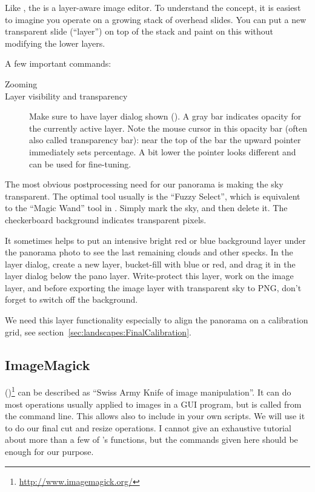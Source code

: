 Like , the  is a layer-aware image
editor. To understand the concept, it is easiest to imagine you
operate on a growing stack of overhead slides. You can put a new
transparent slide (``layer'') on top of the stack and paint on this
without modifying the lower layers.



A few important commands:

\begin{description}
\item[Zooming] 
\item[Layer visibility and transparency] Make sure to have layer
  dialog shown (). A gray bar indicates
  opacity for the currently active layer. Note the mouse cursor in
  this opacity bar (often also called transparency bar): near the top
  of the bar the upward pointer immediately sets percentage. A bit
  lower the pointer looks different and can be used for fine-tuning.
\end{description}


The most obvious postprocessing need for our panorama is making the sky
transparent. The optimal tool usually is the ``Fuzzy Select'', which
is equivalent to the ``Magic Wand'' tool in . Simply mark the
sky, and then delete it. The checkerboard background indicates
transparent pixels.


It sometimes helps to put an intensive bright red or blue background layer under the
panorama photo to see the last remaining clouds and other specks. In the layer dialog,
create a new layer, bucket-fill with blue or red, and drag it in the
layer dialog below the pano layer. Write-protect this layer, work on
the image layer, and before exporting the image layer with transparent
sky to PNG, don't forget to switch off the background.

We need this layer functionality especially to align the panorama on a
calibration grid, see section~\ref{sec:landscapes:FinalCalibration}. 





\subsection{ImageMagick}
\label{sec:landscapes:ImageMagick}

 ()\footnote{\url{http://www.imagemagick.org/}} can be described as ``Swiss Army Knife of image
manipulation''. It can do most operations usually applied to images in
a GUI program, but is called from the command line. This allows also
to include  in your own  scripts. We will use it to do our final
cut and resize operations. I cannot give an exhaustive tutorial about
more than a few of 's functions, but the commands given here should be
enough for our purpose.

